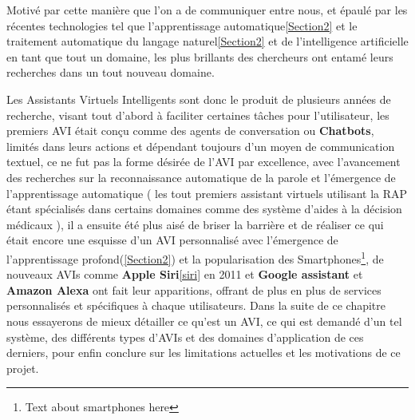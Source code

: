 \par 
Motivé par cette manière que l'on a de communiquer entre nous, et épaulé par les récentes technologies tel que l'apprentissage automatique\ref{Section2} et le traitement automatique du langage naturel\ref{Section2} et de l'intelligence artificielle en tant que tout un domaine, les plus brillants des chercheurs ont entamé leurs recherches dans un tout nouveau domaine.
\par 
Les Assistants Virtuels Intelligents sont donc le produit de plusieurs années de recherche, visant tout d'abord à faciliter certaines tâches pour l'utilisateur, les premiers AVI était conçu comme des agents de conversation ou \textbf{Chatbots}, limités dans leurs actions et dépendant toujours d'un moyen de communication textuel, ce ne fut pas la forme désirée de l'AVI par excellence, avec l'avancement des recherches sur la reconnaissance automatique de la parole et l'émergence de l'apprentissage automatique ( les tout premiers assistant virtuels utilisant la RAP étant spécialisés dans certains domaines comme des système d'aides à la décision médicaux ), il a ensuite été plus aisé de briser la barrière et de réaliser ce qui était encore une esquisse d'un AVI personnalisé avec l'émergence de l'apprentissage profond(\ref{Section2}) et la popularisation des Smartphones\footnote{Text about smartphones here }, de nouveaux AVIs comme \textbf{Apple Siri}\ref{siri} en 2011 et \textbf{Google assistant} et \textbf{Amazon Alexa} ont fait leur apparitions, offrant de plus en plus de services personnalisés et spécifiques à chaque utilisateurs.
Dans la suite de ce chapitre nous essayerons de mieux détailler ce qu'est un AVI, ce qui est demandé d'un tel système, des différents types d'AVIs et des domaines d'application de ces derniers, pour enfin  conclure sur les limitations actuelles et les motivations de ce projet. 

\newpage
